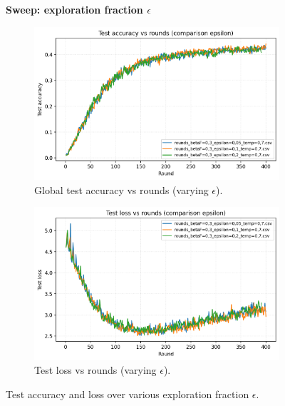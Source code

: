 \documentclass[10pt,twocolumn,letterpaper]{article}
\begin{document}
\label{sec:plots-eps}
\begin{figure}[htbp]
\noindent\textbf{Sweep: exploration fraction \(\epsilon\)}

  \centering
  \begin{subfigure}[b]{0.48\linewidth}
    \centering
    \includegraphics[width=\linewidth]{figs/compare_test_acc_epsilon.png}
    \caption{Global test accuracy vs rounds (varying \(\epsilon\)).}
    \label{fig:eps-acc}
  \end{subfigure}
  \hfill
  \begin{subfigure}[b]{0.48\linewidth}
    \centering
    \includegraphics[width=\linewidth]{figs/compare_test_loss_epsilon.png}
    \caption{Test loss vs rounds (varying \(\epsilon\)).}
    \label{fig:eps-loss}
  \end{subfigure}
  \caption{Test accuracy and loss over various exploration fraction \(\epsilon\).}
  \label{fig:eps-sweep}
\end{figure}
\FloatBarrier
\end{document}

